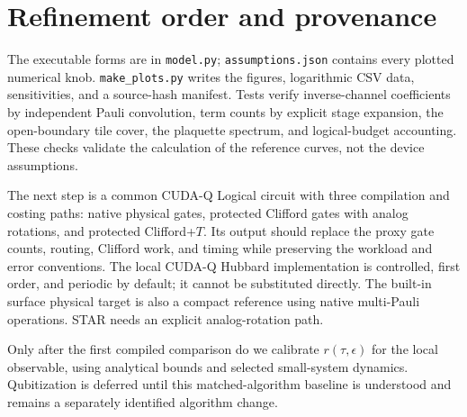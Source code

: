 \documentclass[11pt]{article}
\newcommand{\eps}{\epsilon}
\begin{document}
\section{Refinement order and provenance}
The executable forms are in \texttt{model.py}; \texttt{assumptions.json}
contains every plotted numerical knob. \texttt{make\_plots.py} writes the
figures, logarithmic CSV data, sensitivities, and a source-hash manifest.
Tests verify inverse-channel coefficients by independent Pauli convolution,
term counts by explicit stage expansion, the open-boundary tile cover,
the plaquette spectrum, and logical-budget accounting. These checks validate
the calculation of the reference curves, not the device assumptions.

The next step is a common CUDA-Q Logical circuit with three compilation and
costing paths: native physical gates, protected Clifford gates with analog
rotations, and protected Clifford+$T$. Its output should replace the proxy
gate counts, routing, Clifford work, and timing while preserving the workload
and error conventions. The local CUDA-Q Hubbard implementation is controlled,
first order, and periodic by default; it cannot be substituted directly.
The built-in surface physical target is also a compact reference using native
multi-Pauli operations. STAR needs an explicit analog-rotation path.

Only after the first compiled comparison do we calibrate $r(\tau,\eps)$ for
the local observable, using analytical bounds and selected small-system
dynamics. Qubitization is deferred until this matched-algorithm baseline
is understood and remains a separately identified algorithm change.



\end{document}

